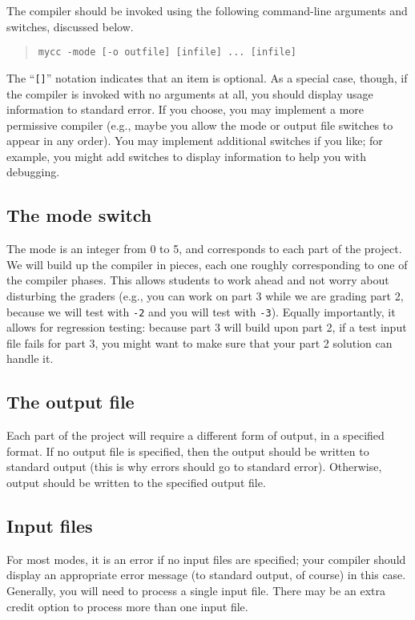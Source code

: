 \documentclass{article}
\newcommand{\compiler}{mycc}
\begin{document}
The compiler should be invoked using the following
command-line arguments and switches, discussed below.
\begin{quote}
\tt \compiler{} -mode [-o outfile] [infile] ... [infile]
\end{quote}
The ``{\tt []}'' notation indicates that an item is optional.
As a special case, though,
if the compiler is invoked with no arguments at all,
  you should display usage information to standard error.
If you choose, you may implement a more permissive compiler
(e.g., maybe you allow the mode or output file switches
to appear in any order).
You may implement additional switches if you like;
for example,
  you might add switches to display information
  to help you with debugging.

\subsection{The mode switch}

The mode is an integer from 0 to 5, 
and corresponds to each part of the project.
We will build up the compiler in pieces,
each one roughly corresponding to one of the compiler phases.
This allows students to work ahead and not worry about disturbing the graders
(e.g., you can work on part 3 while we are grading part 2,
because we will test with {\tt -2} and you will test with {\tt -3}).
Equally importantly,
it allows for regression testing:
because part 3 will build upon part 2,
if a test input file fails for part 3,
  you might want to make sure that your part 2 solution can handle it.

\subsection{The output file}

Each part of the project will require a different form of output,
in a specified format.
If no output file is specified, then the output should be written
to standard output
(this is why errors should go to standard error).
Otherwise, output should be written to the specified output file.

\subsection{Input files}

For most modes, it is an error if no input files are specified;
your compiler should display an appropriate error message
(to standard output, of course) in this case.
Generally, you will need to process a single input file.
There may be an extra credit option to process more than one input file.
\end{document}
